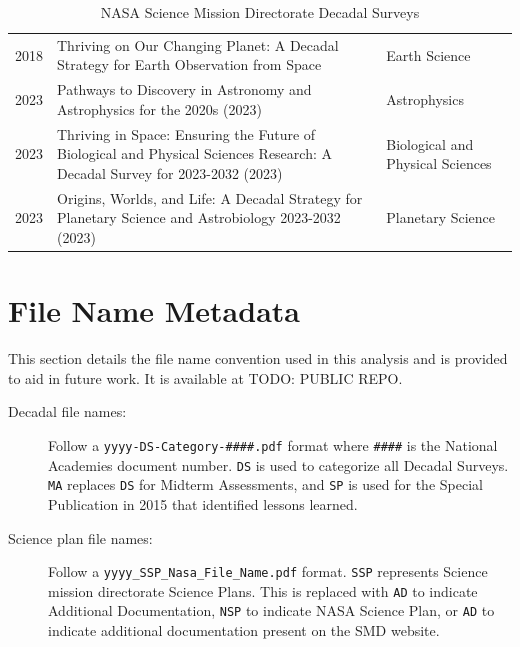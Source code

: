 \documentclass[preprint,12pt]{elsarticle}
\begin{document}
\begin{table}[H]
\begin{tabular}{p{1.2cm} p{8.5cm} p{2.9cm}}
 2018 & Thriving on Our Changing Planet: A Decadal Strategy for Earth Observation from Space & Earth Science \\

 2023 & Pathways to Discovery in Astronomy and Astrophysics for the 2020s (2023) & Astrophysics \\

 2023 & Thriving in Space: Ensuring the Future of Biological and Physical Sciences Research: A Decadal Survey for 2023-2032 (2023) & Biological and Physical Sciences \\

 2023 & Origins, Worlds, and Life: A Decadal Strategy for Planetary Science and Astrobiology 2023-2032 (2023) & Planetary Science \\

\end{tabular}
\caption{NASA Science Mission Directorate Decadal Surveys}\label{tab:Decadals_all}
\end{table}

\section{File Name Metadata}
\label{app_file_names}
This section details the file name convention used in this analysis and is provided to aid in future work. It is available at TODO: PUBLIC REPO. 

\begin{description}
 \item[Decadal file names:] Follow a \texttt{yyyy-DS-Category-\#\#\#\#.pdf} format where \texttt{\#\#\#\#} is the National Academies document number. \texttt{DS} is used to categorize all Decadal Surveys. \texttt{MA} replaces \texttt{DS} for Midterm Assessments, and \texttt{SP} is used for the Special Publication in 2015 that identified lessons learned.
 
 \item[Science plan file names:] Follow a \texttt{yyyy\_SSP\_Nasa\_File\_Name.pdf} format. \texttt{SSP} represents Science mission directorate Science Plans. This is replaced with \texttt{AD} to indicate Additional Documentation, \texttt{NSP} to indicate NASA Science Plan, or \texttt{AD} to indicate additional documentation present on the SMD website.
\end{description} 




 

\end{document}
